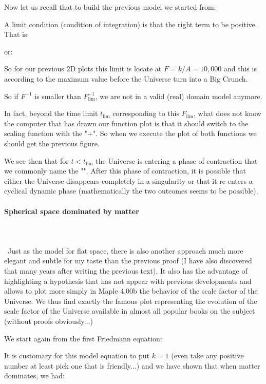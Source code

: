 	Now let us recall that to build the previous model we started from:
	
	A limit condition (condition of integration) is that the right term to be positive. That is:
	
	or:
	
	So for our previous $2$D plots this limit is locate at $F=k/A=10,000$ and this is according to the maximum value before the Universe turn into a Big Crunch.
	
	So if $F^{-1}$ is smaller than $F_{\lim}^{-1}$, we are not in a valid (real) domain model anymore.
	
	In fact, beyond the time limit $t_{\lim}$ corresponding to this $F_{\lim}$, what does not know the computer that has drawn our function plot is that it should switch to the scaling function with the "$+$". So when we execute the plot of both functions we should get the previous figure.
	
	We see then that for $t<t_{\lim}$ the Universe is entering a phase of contraction that we commonly name the "". After this phase of contraction, it is possible that either the Universe disappears completely in a singularity or that it re-enters a cyclical dynamic phase (mathematically the two outcomes seems to be possible).
	
	\paragraph{Spherical space dominated by matter}\mbox{}\\\\\
	Just as the model for flat space, there is also another approach much more elegant and subtle for my taste than the previous proof (I have also discovered that many years after writing the previous text). It also has the advantage of highlighting a hypothesis that has not appear with previous developments and allows to plot more simply in Maple 4.00b the behavior of the scale factor of the Universe. We thus find exactly the famous plot representing the evolution of the scale factor of the Universe available in almost all popular books on the subject (without proofs obviously...)

	We start again from the first Friedmann equation:
	
	It is customary for this model equation to put $k=1$ (even take any positive number at least pick one that is friendly...) and we have shown that when matter dominates, we had:
	
